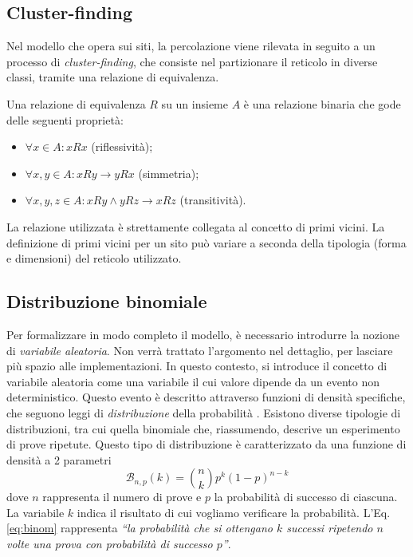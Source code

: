 \subsection*{Cluster-finding}
Nel modello che opera sui siti, la percolazione viene rilevata in seguito a un processo 
di \textit{cluster-finding}, che consiste nel partizionare il reticolo in diverse 
classi, tramite una relazione di equivalenza. 
\begin{definition}
Una relazione di equivalenza $R$ su un insieme $A$ è una relazione binaria 
che gode delle seguenti proprietà:
\begin{itemize}
    \item $\forall x \in A : xRx$ (riflessività);
    \item $\forall x,y \in A : xRy \rightarrow yRx$ (simmetria);
    \item $\forall x,y,z \in A: xRy \wedge yRz \rightarrow xRz$ (transitività).
\end{itemize}
\end{definition}
La relazione utilizzata è strettamente collegata al concetto di primi vicini.
La definizione di primi vicini per un sito può variare a seconda della tipologia
(forma e dimensioni) del reticolo utilizzato.

\subsection*{Distribuzione binomiale}
Per formalizzare in modo completo il modello, è necessario introdurre 
la nozione di \textit{variabile aleatoria}. Non verrà trattato l'argomento 
nel dettaglio, per lasciare più spazio alle implementazioni.
In questo contesto, si introduce il concetto di variabile aleatoria come 
una variabile il cui valore dipende da un evento non deterministico.
Questo evento è descritto attraverso funzioni di densità specifiche, che seguono 
leggi di \textit{distribuzione} della probabilità \cite{random}. Esistono diverse 
tipologie di distribuzioni, tra cui quella binomiale che, riassumendo, descrive 
un esperimento di prove ripetute.
Questo tipo di distribuzione è caratterizzato da una funzione di densità 
a 2 parametri
\begin{equation}
    \mathcal{B}_{n, p}(k) = \binom{n}{k} p^k (1-p)^{n-k}
    \label{eq:binom}
\end{equation}
dove $n$ rappresenta il numero di prove e $p$ la probabilità di successo di ciascuna.
La variabile $k$ indica il risultato di cui vogliamo verificare la probabilità.
L'Eq. \ref{eq:binom} rappresenta \textit{``la probabilità che si ottengano $k$ successi
ripetendo $n$ volte una prova con probabilità di successo $p$''}.

